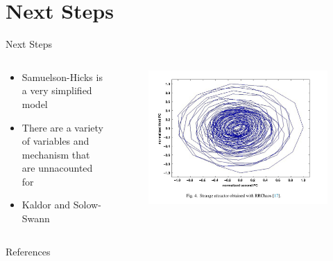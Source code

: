 \documentclass{beamer}
\begin{document}
\section*{Next Steps}
\begin{frame}{Next Steps}
	\begin{columns}
		\begin{column}{0.5\textwidth}
			\begin{itemize}
				\item
					Samuelson-Hicks is a very simplified model
				\pause
				\item
					There are a variety of variables and mechanism that are unnacounted for
				\pause
				\item
					Kaldor and Solow-Swann
			\end{itemize}
		\end{column}
		\begin{column}{0.5\textwidth}
			\begin{figure}
				\centering
				\includegraphics[width=\textwidth]{kaldor.png}
			\end{figure}
		\end{column}
	\end{columns}
\end{frame}

\begin{frame}[allowframebreaks]{References}
	\nocite{*}
	\printbibliography
\end{frame}
\end{document}
